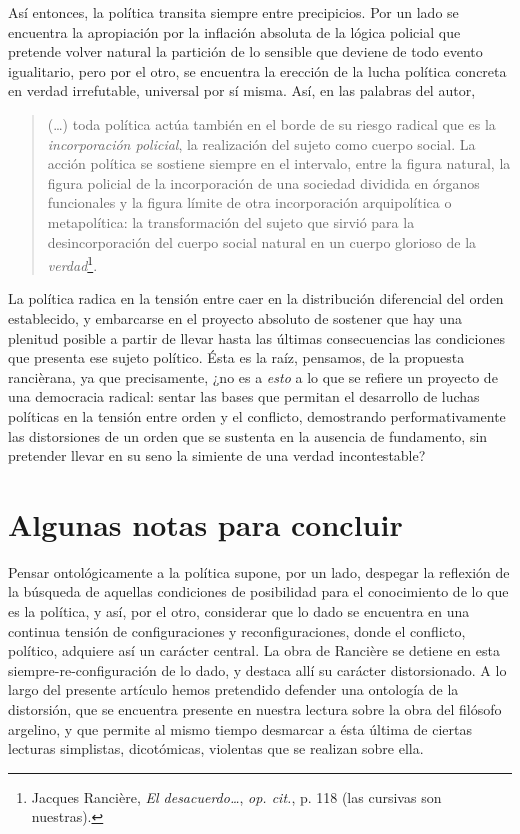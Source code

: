 Así entonces, la política transita siempre entre precipicios. Por un
lado se encuentra la apropiación por la inflación absoluta de la lógica
policial que pretende volver natural la partición de lo sensible que
deviene de todo evento igualitario, pero por el otro, se encuentra la
erección de la lucha política concreta en verdad irrefutable, universal
por sí misma. Así, en las palabras del autor,

\begin{quote}
(\dots) toda política actúa también en el borde de su riesgo
radical que es la \emph{incorporación policial}, la realización del
sujeto como cuerpo social. La acción política se sostiene siempre en el
intervalo, entre la figura natural, la figura policial de la
incorporación de una sociedad dividida en órganos funcionales y la
figura límite de otra incorporación arquipolítica o metapolítica: la
transformación del sujeto que sirvió para la desincorporación del cuerpo
social natural en un cuerpo glorioso de la \emph{verdad}\footnote{Jacques
  Rancière, \emph{El desacuerdo\ldots{}}, \emph{op. cit.}, p. 118 (las
  cursivas son nuestras).}.
\end{quote}

La política radica en la tensión entre caer en la distribución
diferencial del orden establecido, y embarcarse en el proyecto absoluto
de sostener que hay una plenitud posible a partir de llevar hasta las
últimas consecuencias las condiciones que presenta ese sujeto político.
Ésta es la raíz, pensamos, de la propuesta rancièrana, ya que
precisamente, ¿no es a \emph{esto} a lo que se refiere un proyecto de
una democracia radical: sentar las bases que permitan el desarrollo de
luchas políticas en la tensión entre orden y el conflicto, demostrando
performativamente las distorsiones de un orden que se sustenta en la
ausencia de fundamento, sin pretender llevar en su seno la simiente de
una verdad incontestable?

\section{Algunas notas para concluir}

Pensar ontológicamente a la política supone, por un lado, despegar la
reflexión de la búsqueda de aquellas condiciones de posibilidad para el
conocimiento de lo que es la política, y así, por el otro, considerar
que lo dado se encuentra en una continua tensión de configuraciones y
reconfiguraciones, donde el conflicto, político, adquiere así un
carácter central. La obra de Rancière se detiene en esta
siempre-re-configuración de lo dado, y destaca allí su carácter
distorsionado. A lo largo del presente artículo hemos pretendido
defender una ontología de la distorsión, que se encuentra presente en
nuestra lectura sobre la obra del filósofo argelino, y que permite al
mismo tiempo desmarcar a ésta última de ciertas lecturas simplistas,
dicotómicas, violentas que se realizan sobre ella.

